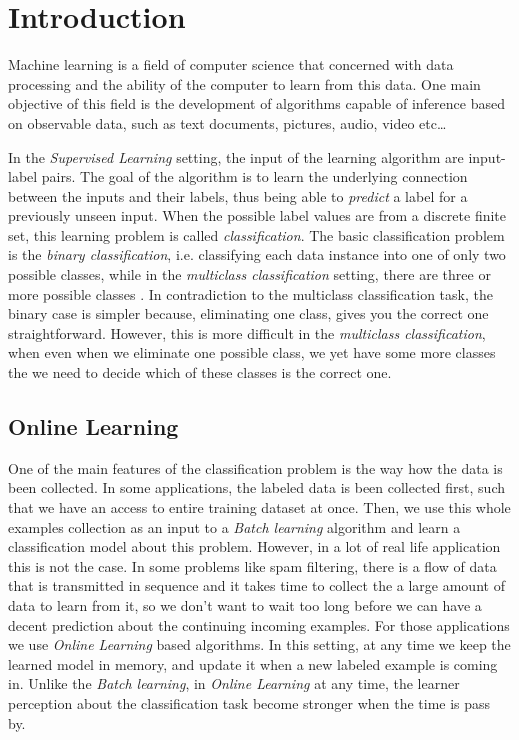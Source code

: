 \chapter{Introduction}


Machine learning is a  field of computer science that concerned with data processing and the ability
of the computer to learn from this data. 
One main objective of this field is the development of algorithms capable of inference based on 
observable data, such as text documents, pictures, audio, video etc\ldots 
 
In the \textit{Supervised Learning} setting, the input of the learning algorithm are input-label pairs. 
The goal of the algorithm is to learn the underlying connection between the inputs and their labels, 
thus being able to \textit{predict} a label for a previously unseen input. 
When the possible label values are from a discrete finite set, this learning problem is called
 \textit{classification}. The basic classification problem is the \textit{binary classification}, i.e. classifying 
 each data instance into one of only two possible classes, while in the \textit{multiclass classification} setting, 
 there are three or more possible classes . In contradiction to the multiclass classification task, the binary 
 case is simpler because, eliminating one class, gives you the correct one 
 straightforward. However, this is more difficult in the \textit{multiclass 
 classification}, when even when we eliminate one possible class, we yet have 
 some more classes the we need to decide which of these classes  is the correct one. 
 

\section{Online Learning}
\label{sec:online_learning}

One of the main features of the classification problem is the way how the data is been collected. 
In some applications, the labeled data is been collected first, such that we have an access to entire training
 dataset at once. Then, we use this whole examples collection as an input to 
 a \textit{Batch learning} algorithm and learn a classification model about this problem. 
However, in a lot of real life application this is not the case. In some problems like spam filtering, there is
a flow of data that is transmitted in sequence and it takes time to collect the a large amount of data to learn
 from it, so we don't want to wait too long before we can have a decent prediction about the continuing
  incoming examples. For those applications we use  \textit{Online Learning} based algorithms. 
  In this setting, at any time we keep the learned model in memory, and update it when 
  a new labeled example is coming in.
Unlike the \textit{Batch learning}, in \textit{Online Learning} at any time, 
the learner perception about the classification task become stronger when the time is pass by.
 
